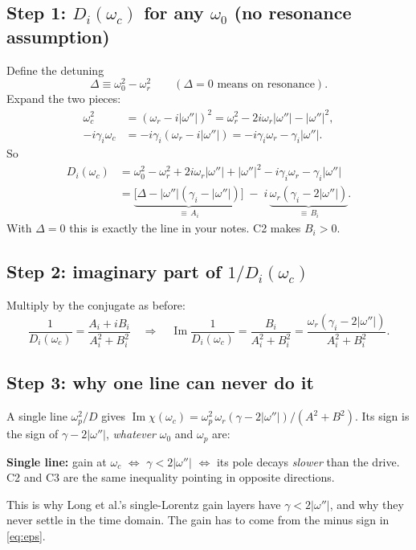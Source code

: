 \documentclass[11pt]{article}
\newcommand{\wi}{|\omega''|}          %
\renewcommand{\Im}{\operatorname{Im}}
\begin{document}
\subsection*{Step 1: $D_i(\omega_c)$ for any $\omega_0$ (no resonance assumption)}
Define the detuning
\begin{equation}
  \Delta \equiv \omega_0^2 - \omega_r^2 \qquad (\Delta=0 \text{ means on resonance}).
\end{equation}
Expand the two pieces:
\begin{align}
  \omega_c^2 &= (\omega_r-i\wi)^2 = \omega_r^2 - 2i\omega_r\wi - \wi^2,\\
  -i\gamma_i\omega_c &= -i\gamma_i(\omega_r - i\wi) = -i\gamma_i\omega_r - \gamma_i\wi .
\end{align}
So
\begin{align}
  D_i(\omega_c) &= \omega_0^2 - \omega_r^2 + 2i\omega_r\wi + \wi^2 - i\gamma_i\omega_r - \gamma_i\wi \nonumber\\
  &= \underbrace{\big[\Delta - \wi(\gamma_i-\wi)\big]}_{\equiv\,A_i}
     \;-\; i\,\underbrace{\omega_r(\gamma_i-2\wi)}_{\equiv\,B_i}.
  \label{eq:AB}
\end{align}
With $\Delta=0$ this is exactly the line in your notes. C2 makes $B_i>0$.

\subsection*{Step 2: imaginary part of $1/D_i(\omega_c)$}
Multiply by the conjugate as before:
\begin{equation}
  \frac{1}{D_i(\omega_c)} = \frac{A_i + iB_i}{A_i^2+B_i^2}
  \quad\Longrightarrow\quad
  \Im\frac{1}{D_i(\omega_c)} = \frac{B_i}{A_i^2+B_i^2}
  = \frac{\omega_r(\gamma_i-2\wi)}{A_i^2+B_i^2}.
  \label{eq:imD}
\end{equation}

\subsection*{Step 3: why one line can never do it}
A single line $\omega_p^2/D$ gives $\Im\chi(\omega_c) = \omega_p^2\,\omega_r(\gamma-2\wi)/(A^2+B^2)$. Its sign is the sign of $\gamma-2\wi$, \emph{whatever} $\omega_0$ and $\omega_p$ are:
\begin{result}
\textbf{Single line:} gain at $\omega_c$ $\iff$ $\gamma<2\wi$ $\iff$ its pole decays \emph{slower} than the drive.
C2 and C3 are the same inequality pointing in opposite directions.
\end{result}
This is why Long et al.'s single-Lorentz gain layers have $\gamma<2\wi$, and why they never settle in the time domain.
The gain has to come from the minus sign in \eqref{eq:eps}.
\end{document}
